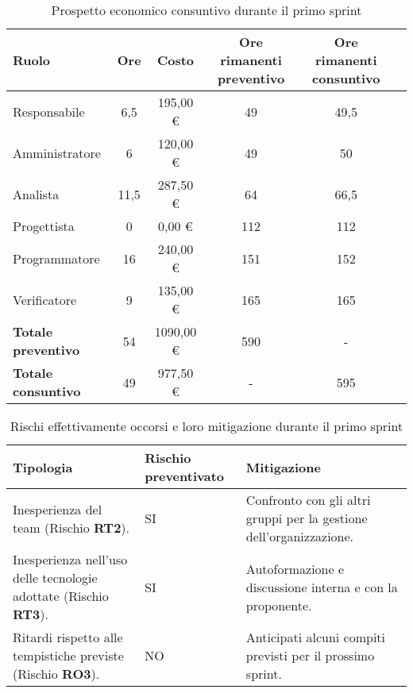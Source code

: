 \begin{table}[!h]
    \centering
    \begin{tabular}{ | l | c | c | c | c | c | }
        \hline
        \textbf{Ruolo} & \textbf{Ore} & \textbf{Costo} & \textbf{Ore rimanenti preventivo} & \textbf{Ore rimanenti consuntivo} \\
        \hline
        Responsabile               &  6,5 &  195,00 € &  49   &  49,5 \\
        Amministratore             &  6   &  120,00 € &  49   &  50   \\
        Analista                   & 11,5 &  287,50 € &  64   &  66,5 \\
        Progettista                &  0   &    0,00 € & 112   & 112   \\
        Programmatore              & 16   &  240,00 € & 151   & 152   \\
        Verificatore               &  9   &  135,00 € & 165   & 165   \\
        \hline
        \textbf{Totale preventivo} & 54   & 1090,00 € & 590   &   -   \\
        \hline
        \textbf{Totale consuntivo} & 49   &  977,50 € &   -   & 595   \\
        \hline
    \end{tabular}
    \caption{Prospetto economico consuntivo durante il primo sprint}
    \label{tab:15}
\end{table}

\newpage
{}
\begin{table}[!h]
    \centering
    \begin{tabular}{ | p{6cm} | p{2.5cm} | p{7.5cm} | }
        \hline
        \textbf{Tipologia} & \textbf{Rischio preventivato} & \textbf{Mitigazione}  \\
        \hline
        Inesperienza del team (Rischio \textbf{RT2}). & SI & Confronto con gli altri gruppi per la gestione dell'organizzazione.\\
        \hline
        Inesperienza nell'uso delle tecnologie adottate (Rischio \textbf{RT3}). & SI & Autoformazione e discussione interna e con la proponente.\\
        \hline
        Ritardi rispetto alle tempistiche previste (Rischio \textbf{RO3}). & NO & Anticipati alcuni compiti previsti per il prossimo sprint.\\
        \hline
    \end{tabular}
    \caption{Rischi effettivamente occorsi e loro mitigazione durante il primo sprint}
    \label{tab:16}
\end{table}

